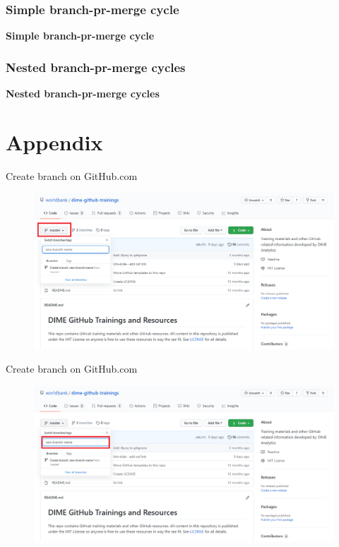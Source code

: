 \documentclass[aspectratio=169]{beamer} %
\begin{document}
\begin{frame}
	\frametitle{Simple branch-pr-merge cycle}
	
	\huge\centering \textbf{Simple branch-pr-merge cycle}
	
\end{frame}
	

\begin{frame}
	\frametitle{Nested branch-pr-merge cycles}
	
	\huge\centering \textbf{Nested branch-pr-merge cycles}
	
\end{frame}




\section{Appendix}

\begin{frame}{Create branch on GitHub.com}
\label{new-branch}

\begin{figure}
	\centering
	\includegraphics[width=.9\textwidth]{./img/new-branch-1.png}
\end{figure}
\end{frame}

\begin{frame}{Create branch on GitHub.com}
\begin{figure}
	\centering
	\includegraphics[width=.9\textwidth]{./img/new-branch-2.png}
\end{figure}
\end{frame}
\end{document}
